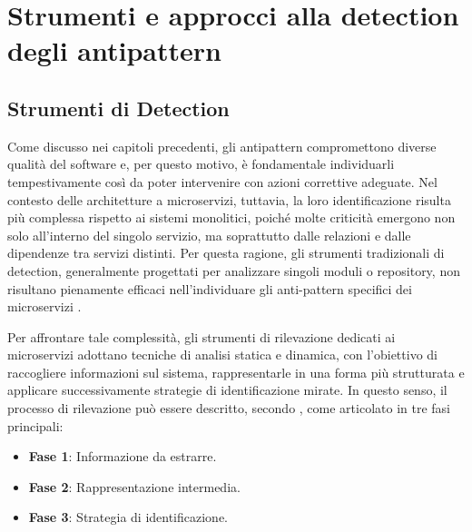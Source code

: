 \chapter{Strumenti e approcci alla detection degli antipattern}
\label{sec:capitolo4}
\section{Strumenti di Detection}
Come discusso nei capitoli precedenti, gli antipattern compromettono diverse qualità del software e, per questo motivo, è fondamentale individuarli tempestivamente così da poter intervenire con azioni correttive adeguate. Nel contesto delle architetture a microservizi, tuttavia, la loro identificazione risulta più complessa rispetto ai sistemi monolitici, poiché molte criticità emergono non solo all'interno del singolo servizio, ma soprattutto dalle relazioni e dalle dipendenze tra servizi distinti. Per questa ragione, gli strumenti tradizionali di detection, generalmente progettati per analizzare singoli moduli o repository, non risultano pienamente efficaci nell'individuare gli anti-pattern specifici dei microservizi \cite{CernyCatalogo, MSAnose}.

Per affrontare tale complessità, gli strumenti di rilevazione dedicati ai microservizi adottano tecniche di analisi statica e dinamica, con l'obiettivo di raccogliere informazioni sul sistema, rappresentarle in una forma più strutturata e applicare successivamente strategie di identificazione mirate. In questo senso, il processo di rilevazione può essere descritto, secondo \cite{CernyCatalogo}, come articolato in tre fasi principali:
\begin{itemize}
    \item \textbf{Fase 1}: Informazione da estrarre.
    \item \textbf{Fase 2}: Rappresentazione intermedia.
    \item \textbf{Fase 3}: Strategia di identificazione.
\end{itemize}


